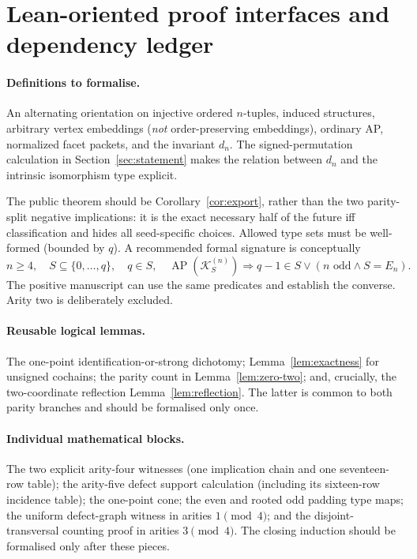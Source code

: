 \documentclass[11pt,a4paper]{article}
\theoremstyle{remark}
\newcommand{\K}{\mathcal K}
\begin{document}
\section{Lean-oriented proof interfaces and dependency ledger}
\label{app:lean}
\paragraph{Definitions to formalise.}
An alternating orientation on injective ordered $n$-tuples,
induced structures, arbitrary vertex embeddings (\emph{not}
order-preserving embeddings), ordinary AP, normalized facet packets,
and the invariant $d_n$. The signed-permutation calculation in
Section~\ref{sec:statement} makes the relation between $d_n$ and
the intrinsic isomorphism type explicit.

The public theorem should be Corollary~\ref{cor:export}, rather than
the two parity-split negative implications: it is the exact necessary
half of the future iff classification and hides all seed-specific
choices. Allowed type sets must be well-formed (bounded by $q$).
A recommended formal signature is conceptually
\[
  n\ge4,\quad S\subseteq\{0,\ldots,q\},\quad
  q\in S,\quad\operatorname{AP}(\K^{(n)}_S)
  \Longrightarrow q-1\in S\lor(n\text{ odd}\land S=E_n).
\]
The positive manuscript can use the same predicates and establish
the converse. Arity two is deliberately excluded.

\paragraph{Reusable logical lemmas.}
The one-point identification-or-strong dichotomy;
Lemma~\ref{lem:exactness} for unsigned cochains;
the parity count in Lemma~\ref{lem:zero-two};
and, crucially, the two-coordinate reflection
Lemma~\ref{lem:reflection}. The latter is common to both parity
branches and should be formalised only once.

\paragraph{Individual mathematical blocks.}
The two explicit arity-four witnesses (one implication chain and
one seventeen-row table); the arity-five defect support calculation
(including its sixteen-row incidence table); the one-point cone;
the even and rooted odd padding type maps;
the uniform defect-graph witness in arities $1\pmod4$;
and the disjoint-transversal counting proof in arities $3\pmod4$.
The closing induction should be formalised only after these pieces.
\end{document}
